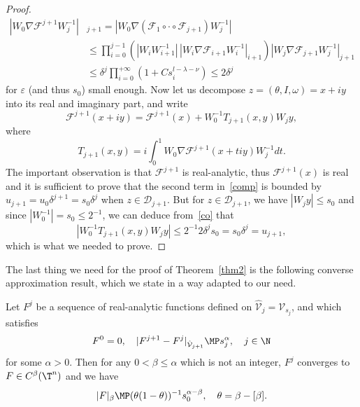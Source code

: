 \begin{proof}
\begin{equation}\label{co}
\begin{split}
|W_0\nabla \mathcal{F}^{j+1}W_{j}^{-1}|&_{j+1} = |W_0\nabla (\mathcal{F}_1 \circ \cdot \circ \mathcal{F}_{j+1})W_{j}^{-1}|
\\
& \leq \prod_{i=0}^{j-1}\left( |W_i W_{i+1}^{-1}|\, |W_i\nabla \mathcal{F}_{i+1} W_i^{-1}|_{i+1} \right) |W_j\nabla \mathcal{F}_{j+1} W_j^{-1}|_{j+1} \\
& \leq \delta^j \prod_{i=0}^{+\infty}(1+Cs_{i}^{l-\lambda-\nu}) \leq 2\delta^j
\end{split}
\end{equation}
for $\varepsilon$ (and thus $s_0$) small enough. Now let us decompose $z=(\theta,I,\omega)=x+iy$ into its real and imaginary part, and write
\begin{equation}\label{comp}
\mathcal{F}^{j+1}(x+iy)=\mathcal{F}^{j+1}(x)+W_0^{-1}T_{j+1}(x,y)W_j y,
\end{equation}
where
\[ T_{j+1}(x,y)=i\int_0^1W_0\nabla \mathcal{F}^{j+1}(x+tiy)W_j^{-1}dt. \]
The important observation is that $\mathcal{F}^{j+1}$ is real-analytic, thus $\mathcal{F}^{j+1}(x)$ is real and it is sufficient to prove that the second term in~\eqref{comp} is bounded by $u_{j+1}=u_0\delta^{j+1}=s_0\delta^j$ when $z \in \mathcal{D}_{j+1}$. But for $z\in \mathcal{D}_{j+1}$, we have $|W_jy| \leq s_0$ and since $|W_0^{-1}|=s_0 \leq 2^{-1}$, we can deduce from~\eqref{co} that
\[ |W_0^{-1}T_{j+1}(x,y)W_j y| \leq 2^{-1}2\delta^js_0=s_0\delta^j=u_{j+1}, \]
which is what we needed to prove.
\end{proof}

The last thing we need for the proof of Theorem~\ref{thm2} is the following converse approximation result, which we state in a way adapted to our need.

\begin{proposition}\label{convsmoothing}
Let $F^j$ be a sequence of real-analytic functions defined on $\hat{\mathcal{V}}_j=\mathcal{V}_{s_j}$, and which satisfies
\[ F^0=0, \quad |F^{j+1}-F^{j}|_{\hat{\mathcal{V}}_{j+1}} \MP s_j^\alpha, \quad j \in \N \]
for some $\alpha>0$. Then for any $0<\beta \leq \alpha$ which is not an integer, $F^j$ converges to $F \in C^\beta(\T^n)$ and we have
\[ |F|_\beta \MP (\theta(1-\theta))^{-1} s_0^{\alpha-\beta}, \quad \theta=\beta-[\beta]. \]
\end{proposition}

